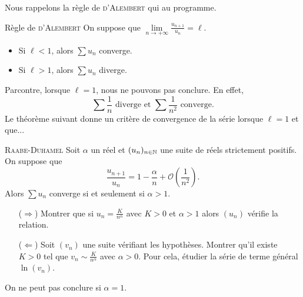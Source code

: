 Nous rappelons la règle de \textsc{d'Alembert} qui au programme.

\begin{theo}{Règle de \textsc{d'Alembert}}
    On suppose que $\lim\limits_{n \to + \infty} \frac{u_{n+1}}{u_n} = \ell$.
    \begin{itemize}
        \item Si $\ell < 1$, alors $\sum u_n$ converge.
        \item Si $\ell > 1$, alors $\sum u_n$ diverge.
    \end{itemize}
\end{theo}
Parcontre, lorsque $\ell = 1$, nous ne pouvons pas conclure. En effet, 
$$\sum \frac{1}{n} \text{ diverge et } \sum \frac{1}{n^2} \text{ converge}.$$
Le théorème suivant donne un critère de convergence de la série lorsque $\ell = 1$ et que...
\begin{theo}{\textsc{Raabe}-\textsc{Duhamel}}
    Soit $\alpha$ un réel et $(u_n)_{n \in \mathbb{N}}$ une suite de réels strictement positifs. On suppose que
    $$\displaystyle \frac{u_{n+1}}{u_n} = 1 - \frac{\alpha}{n} + \mathcal{O} \left( \frac{1}{n^2} \right).$$ Alors $\sum u_n$ converge si et seulement si $\alpha > 1$. 
\end{theo}
\begin{preuve}
    \begin{enumerate}
        \item[($\Rightarrow$)] Montrer que si $u_n=\frac{K}{n^{\alpha}}$ avec $K>0$ et $\alpha > 1$ alors $(u_n)$ vérifie la relation.
        \item[($\Leftarrow$)] Soit $(v_n)$ une suite vérifiant les hypothèses. Montrer qu'il existe $K>0$ tel que $v_n \sim \frac{K}{n^{\alpha}}$ avec $\alpha > 0$. Pour cela, étudier la série de terme général $\ln (v_n)$.
    \end{enumerate}
\end{preuve}

On ne peut pas conclure si $\alpha=1$.